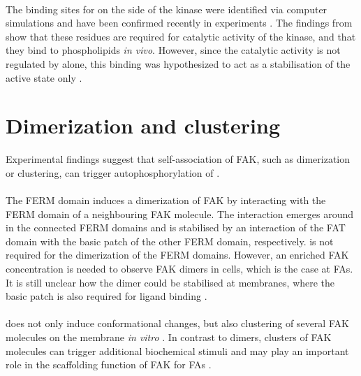 \\
The binding sites for \pip{} on the side of the kinase were identified via computer simulations \autocite{pap002} and have been confirmed recently in experiments \autocite{pap002Exp}. The findings from \textcite{pap002Exp} show that these residues are required for catalytic activity of the kinase, and that they bind to phospholipids \textit{in vivo}. However, since the catalytic activity is not regulated by \pip{} alone, this binding was hypothesized to act as a stabilisation of the active state only \autocite{pap002Exp}.
\section{Dimerization and clustering}
\label{intro:clustering}
Experimental findings suggest that self-association of FAK, such as dimerization or clustering, can trigger autophosphorylation of  \autocites{transAuto}{dimersVsClusters}.\\
\\
The FERM domain induces a dimerization of FAK by interacting with the FERM domain of a neighbouring FAK molecule. The interaction emerges around  in the connected FERM domains and is stabilised by an interaction of the FAT domain with the basic patch of the other FERM domain, respectively. \pip{} is not required for the dimerization of the FERM domains. However, an enriched FAK concentration is needed to observe FAK dimers in cells, which is the case at FAs. It is still unclear how the dimer could be stabilised at membranes, where the basic patch is also required for ligand binding \autocite{fakdimers}.\\
\\
\pip{} does not only induce conformational changes, but also clustering of several FAK molecules on the membrane \textit{in vitro} \autocite{pap001}. In contrast to dimers, clusters of FAK molecules can trigger additional biochemical stimuli \autocite{dimersVsClusters} and may play an important role in the scaffolding function of FAK for FAs \autocite{pap001}.
